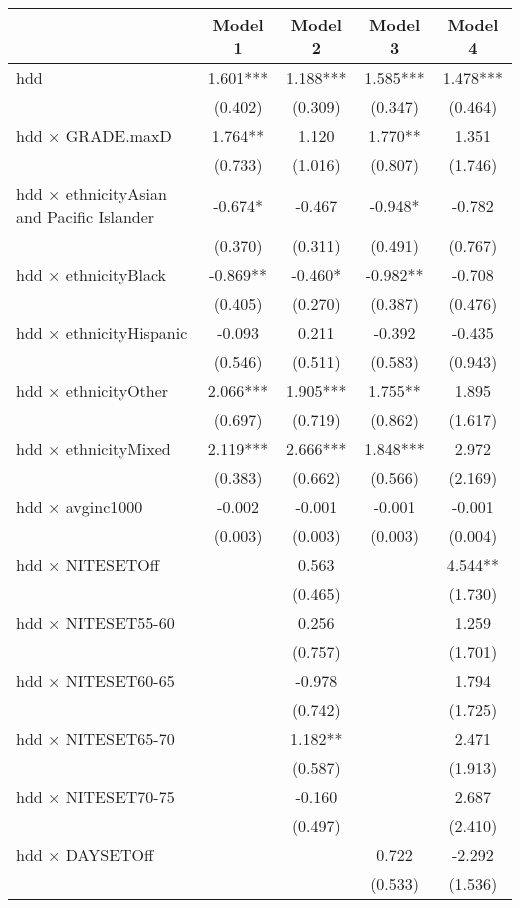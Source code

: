 \documentclass[
]{article}
\begin{document}
\begin{table}[H]
\centering
\begin{tabular}[t]{lcccc}
\toprule
  & Model 1 & Model 2 & Model 3 & Model 4\\
\midrule
hdd & 1.601*** & 1.188*** & 1.585*** & 1.478***\\
 & (0.402) & (0.309) & (0.347) & (0.464)\\
hdd × GRADE.maxD & 1.764** & 1.120 & 1.770** & 1.351\\
 & (0.733) & (1.016) & (0.807) & (1.746)\\
hdd × ethnicityAsian and Pacific Islander & -0.674* & -0.467 & -0.948* & -0.782\\
 & (0.370) & (0.311) & (0.491) & (0.767)\\
hdd × ethnicityBlack & -0.869** & -0.460* & -0.982** & -0.708\\
 & (0.405) & (0.270) & (0.387) & (0.476)\\
hdd × ethnicityHispanic & -0.093 & 0.211 & -0.392 & -0.435\\
 & (0.546) & (0.511) & (0.583) & (0.943)\\
hdd × ethnicityOther & 2.066*** & 1.905*** & 1.755** & 1.895\\
 & (0.697) & (0.719) & (0.862) & (1.617)\\
hdd × ethnicityMixed & 2.119*** & 2.666*** & 1.848*** & 2.972\\
 & (0.383) & (0.662) & (0.566) & (2.169)\\
hdd × avginc1000 & -0.002 & -0.001 & -0.001 & -0.001\\
 & (0.003) & (0.003) & (0.003) & (0.004)\\
hdd × NITESETOff &  & 0.563 &  & 4.544**\\
 &  & (0.465) &  & (1.730)\\
hdd × NITESET55-60 &  & 0.256 &  & 1.259\\
 &  & (0.757) &  & (1.701)\\
hdd × NITESET60-65 &  & -0.978 &  & 1.794\\
 &  & (0.742) &  & (1.725)\\
hdd × NITESET65-70 &  & 1.182** &  & 2.471\\
 &  & (0.587) &  & (1.913)\\
hdd × NITESET70-75 &  & -0.160 &  & 2.687\\
 &  & (0.497) &  & (2.410)\\
hdd × DAYSETOff &  &  & 0.722 & -2.292\\
 &  &  & (0.533) & (1.536)\\

\end{tabular}
\end{table}
\end{document}
